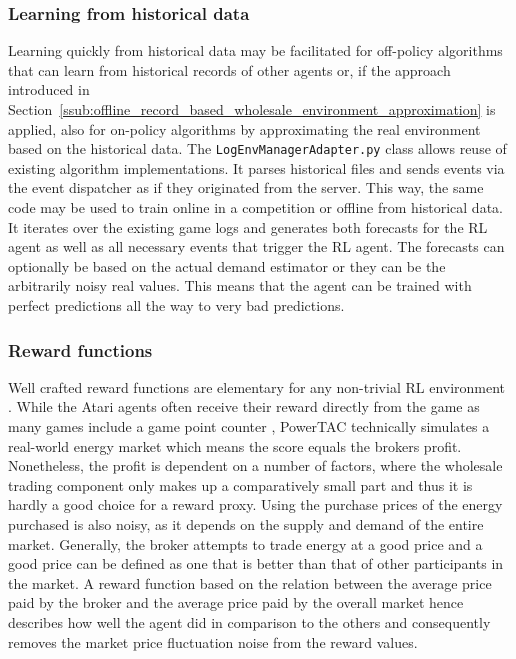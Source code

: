 \subsubsection{Learning from historical data}%
\label{sub:learning_from_historical_data}

Learning quickly from historical data may be facilitated for off-policy algorithms that can learn from historical
records of other agents or, if the approach introduced in
Section~\ref{ssub:offline_record_based_wholesale_environment_approximation} is applied, also for on-policy algorithms by
approximating the real environment based on the historical data.
The \texttt{LogEnvManagerAdapter.py} class allows reuse of existing algorithm implementations. It 
parses historical files and sends events via the event dispatcher as if they originated from the server. This way, the
same code may be used to train online in a competition or offline from historical data. It iterates over the existing
game logs and generates both forecasts for the \ac{RL} agent as well as all necessary events that trigger the \ac{RL}
agent. The forecasts can optionally be based on the actual demand estimator or they can be the arbitrarily noisy real
values. This means that the agent can be trained with perfect predictions all the way to very bad predictions.

\subsubsection{Reward functions}%
\label{sub:reward_functions}

Well crafted reward functions are elementary for any non-trivial \ac{RL}
environment \cite[p.469ff.]{amodei2016concrete, sutton2018reinforcement}. While the Atari agents often receive their reward directly from the
game as many games include a game point counter \cite[]{mnih2013playing}, \ac{PowerTAC} technically simulates a
real-world energy market which means the score equals the brokers profit. Nonetheless, the profit is dependent on a number of
factors, where the wholesale trading component only makes up a comparatively small part and thus it is hardly a
good choice for a reward proxy. Using the purchase prices of the energy purchased is also noisy, as it depends on the
supply and demand of the entire market. Generally, the broker attempts to trade energy at a good price and a good
price can be defined as one that is better than that of other participants in the market. A reward function based on the
relation between the average price paid by the broker and the average price paid by the overall market hence describes
how well the agent did in comparison to the others and consequently removes the market price fluctuation noise from the
reward values.

